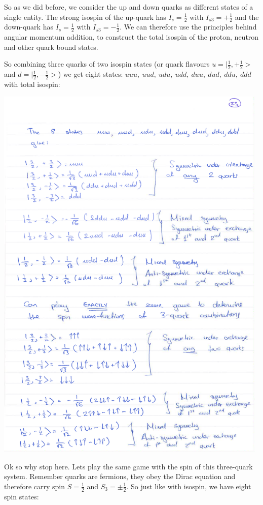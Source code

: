 So as we did before, we consider the up and down quarks as different states of a single
entity. The strong isospin of the up-quark has $I_{s}=\frac{1}{2}$ with 
$I_{s3}=+\frac{1}{2}$ and the down-quark has $I_{s}=\frac{1}{2}$ with $I_{s3}=-\frac{1}{2}$.
We can therefore use the principles behind angular momentum addition, to construct the total isospin of the proton, neutron and other quark bound states. 

So combining three quarks of two isospin states (or quark flavours $u=|\frac{1}{2},+\frac{1}{2}>$ and $d=|\frac{1}{2},-\frac{1}{2}>$) we get
eight states: $uuu,~uud,~udu,~udd,~duu,~dud,~ddu,~ddd$ with total isospin:
\begin{center}
\includegraphics[width=0.98\textwidth]{fig/strongforce/baryon_isospin.pdf}
\end{center}
Ok so why stop here. Lets play the same game with the spin of this three-quark system. Remember quarks are fermions, they obey the Dirac equation and therefore carry spin $S=\frac{1}{2}$ and $S_3=\pm\frac{1}{2}$. So just like with isospin, we have eight spin states:
